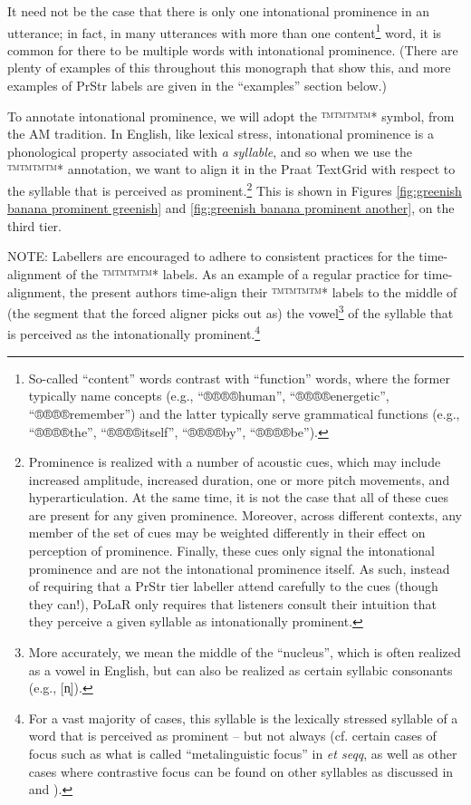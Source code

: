\documentclass[11pt, twoside]{memoir}
\begin{document}
It need not be the case that there is only one intonational prominence in an utterance; in fact, in many utterances with more than one content\footnote{So-called “content” words contrast with “function” words, where the former typically name concepts (e.g., “®®®®{human}”, “®®®®{energetic}”, “®®®®{remember}”) and the latter typically serve grammatical functions (e.g., “®®®®{the}”, “®®®®{itself}”, “®®®®{by}”, “®®®®{be}”).} word, it is common for there to be multiple words with intonational prominence. (There are plenty of examples of this throughout this monograph that show this, and more examples of PrStr labels are given in the “examples” section below.)

To annotate intonational prominence, we will adopt the ™™™™{*} symbol, from the AM tradition. In English, like lexical stress, intonational prominence is a phonological property associated with \textit{a syllable}, and so when we use the ™™™™{*} annotation, we want to align it in the Praat TextGrid with respect to the syllable that is perceived as prominent.\footnote{Prominence is realized with a number of acoustic cues, which may include increased amplitude, increased duration, one or more pitch movements, and hyperarticulation. At the same time, it is not the case that all of these cues are present for any given prominence. Moreover, across different contexts, any member of the set of cues may be weighted differently in their effect on perception of prominence. Finally, these cues only signal the intonational prominence and are not the intonational prominence itself. As such, instead of requiring that a PrStr tier labeller attend carefully to the cues (though they can!), PoLaR only requires that listeners consult their intuition that they perceive a given syllable as intonationally prominent.\label{fn:prominence cues}} This is shown in Figures \ref{fig:greenish banana prominent greenish} and \ref{fig:greenish banana prominent another}, on the third tier.

NOTE: Labellers are encouraged to adhere to consistent practices for the time-alignment of the ™™™™{*} labels. As an example of a regular practice for time-alignment, the present authors time-align their ™™™™{*} labels to the middle of (the segment that the forced aligner picks out as) the vowel\footnote{More accurately, we mean the middle of the “nucleus”, which is often realized as a vowel in English, but can also be realized as certain syllabic consonants (e.g., [n̩]).} of the syllable that is perceived as the intonationally prominent.\footnote{For a vast majority of cases, this syllable is the lexically stressed syllable of a word that is perceived as prominent – but not always (cf. certain cases of focus such as what is called “metalinguistic focus” in \citealt{erteschik-shir99} \textit{et seqq}, as well as other cases where contrastive focus can be found on other syllables as discussed in \citealt{armstrongschwenter16} and \citealt{ahn-21a}).}
\end{document}
